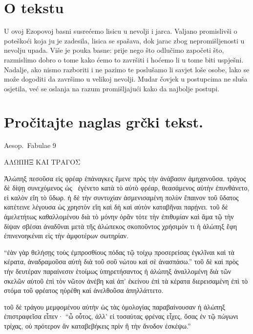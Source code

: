 
\section*{O tekstu}

U ovoj Ezopovoj basni susrećemo lisicu u nevolji i jarca. Valjano promislivši o poteškoći koja ju je zadesila, lisica se spašava, dok jarac zbog nepromišljenosti u nevolju upada. Više je pouka basne: prije nego što odlučimo započeti što, razmislimo dobro o tome kako ćemo to završiti i hoćemo li u tome biti uspješni. Nadalje, ako nismo razboriti i ne pazimo te poslušamo li savjet loše osobe, lako se može dogoditi da završimo u velikoj nevolji. Mudar čovjek u postupcima ne sluša osjetila, već se oslanja na razum promišljajući kako da najbolje postupi.


\section*{Pročitajte naglas grčki tekst.}

Aesop.\ Fabulae 9


\medskip

\begin{greek}
{\large
{ \noindent ΑΛΩΠΗΞ ΚΑΙ ΤΡΑΓΟΣ 

\medskip

\noindent Ἀλώπηξ πεσοῦσα εἰς φρέαρ ἐπάναγκες ἔμενε πρὸς τὴν ἀνάβασιν ἀμηχανοῦσα. τράγος δὲ δίψῃ συνεχόμενος ὡς  ἐγένετο κατὰ τὸ αὐτὸ φρέαρ, θεασάμενος αὐτὴν ἐπυνθάνετο, εἰ καλὸν εἴη τὸ ὕδωρ. ἡ δὲ τὴν συντυχίαν ἀσμενισαμένη πολὺν ἔπαινον τοῦ ὕδατος κατέτεινε λέγουσα ὡς χρηστὸν εἴη καὶ δὴ καὶ αὐτὸν καταβῆναι παρῄνει. τοῦ δὲ ἀμελετήτως καθαλλομένου διὰ τὸ μόνην ὁρᾶν τότε τὴν ἐπιθυμίαν καὶ ἅμα τῷ τὴν δίψαν σβέσαι ἀναδῦναι μετὰ τῆς ἀλώπεκος σκοποῦντος χρήσιμόν τι ἡ ἀλώπηξ ἔφη ἐπινενοηκέναι εἰς τὴν ἀμφοτέρων σωτηρίαν. 

\noindent ``ἐὰν γὰρ θελήσῃς τοὺς ἐμπροσθίους πόδας τῷ τοίχῳ προσερείσας ἐγκλῖναι καὶ τὰ κέρατα, ἀναδραμοῦσα αὐτὴ διὰ τοῦ σοῦ νώτου καὶ σὲ ἀνασπάσω.'' τοῦ δὲ καὶ πρὸς τὴν δευτέραν παραίνεσιν ἑτοίμως ὑπηρετήσαντος ἡ ἀλώπηξ ἀναλλομένη διὰ τῶν σκελῶν αὐτοῦ ἐπὶ τὸν νῶτον ἀνέβη καὶ ἀπ' ἐκείνου ἐπὶ τὰ κέρατα διερεισαμένη ἐπὶ τὸ στόμα τοῦ φρέατος ηὑρέθη καὶ ἀνελθοῦσα ἀπηλλάττετο. 

\noindent τοῦ δὲ τράγου μεμφομένου αὐτὴν ὡς τὰς ὁμολογίας παραβαίνουσαν ἡ ἀλώπηξ ἐπιστραφεῖσα εἶπεν· ``ὦ οὗτος, ἀλλ' εἰ τοσαύτας φρένας εἶχες, ὅσας ἐν τῷ πώγωνι τρίχας, οὐ πρότερον ἂν καταβεβήκεις πρὶν ἢ τὴν ἄνοδον ἐσκέψω.''

}
}
\end{greek}

